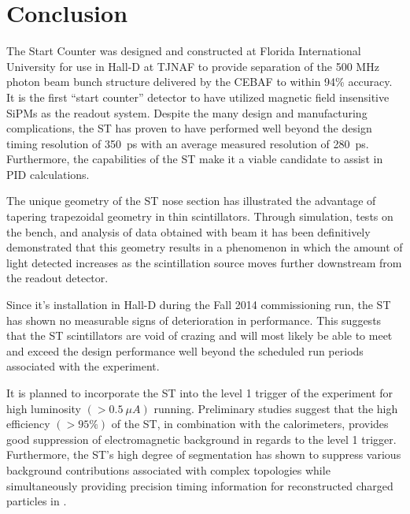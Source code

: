 \section{Conclusion} \label{sec:conclusion}

The \gx{} Start Counter was designed and constructed at Florida International University for use in Hall-D at TJNAF to provide separation of the 500 MHz photon beam bunch structure delivered by the CEBAF to within 94\% accuracy.  It is the first ``start counter'' detector to have utilized magnetic field insensitive SiPMs as the readout system.  Despite the many design and manufacturing complications, the ST has proven to have performed well beyond the design timing resolution of 350~ps with an average measured resolution of 280~ps.  Furthermore, the capabilities of the ST make it a viable candidate to assist in PID calculations.

The unique geometry of the ST nose section has illustrated the advantage of tapering trapezoidal geometry in thin scintillators.  Through simulation, tests on the bench, and analysis of data obtained with beam it has been definitively demonstrated that this geometry results in a phenomenon in which the amount of light detected increases as the scintillation source moves further downstream from the readout detector.

Since it's installation in Hall-D during the Fall 2014 commissioning run, the ST has shown no measurable signs of deterioration in performance.  This suggests that the ST scintillators are void of crazing and will most likely be able to meet and exceed the design performance well beyond the scheduled run periods associated with the \gx{} experiment.

It is planned to incorporate the ST into the level 1 trigger of the \gx{} experiment for high luminosity $(> 0.5\ \mu A)$ running.  Preliminary studies suggest that the high efficiency $(> 95\%)$ of the ST, in combination with the calorimeters, provides good suppression of electromagnetic background in regards to the level 1 trigger.  Furthermore, the ST's high degree of segmentation has shown to suppress various background contributions associated with complex topologies while simultaneously providing precision timing information for reconstructed charged particles in \gx{}.